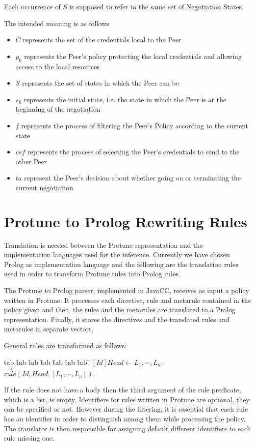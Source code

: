 \documentclass{article}
\newenvironment{program}{\begin{tabbing}
   tab \= tab \= tab \= tab \= tab \= tab \= tab \= \kill}{\end{tabbing}}
\newcommand{\rewrite}{\longrightarrow}
\begin{document}
Each occurrence of $S$ is supposed to refer to the same set of Negotiation States.

The intended meaning is as follows
\begin{itemize}
	\item $C$ represents the set of the credentials local to the Peer
	\item $p_{0}$ represents the Peer's policy protecting the local credentials and allowing access to the local resources
	\item $S$ represents the set of states in which the Peer can be
	\item $s_{0}$ represents the initial state, i.e. the state in which the Peer is at the beginning of the negotiation
	\item $f$ represents the process of filtering the Peer's Policy according to the current state
	\item $csf$ represents the process of selecting the Peer's credentials to send to the other Peer
	\item $ta$ represent the Peer's decision about whether going on or terminating the current negotiation
\end{itemize}

\section{Protune to Prolog Rewriting Rules}

Translation is needed between the Protune representation and the implementation languages used for the inference. Currently we have chosen Prolog as implementation language and the following are the translation rules used in order to transform Protune rules into Prolog rules.

The Protune to Prolog parser, implemented in JavaCC, receives as input a policy written in Protune. It processes each directive, rule and metarule contained in the policy given and then, the rules and the metarules are translated to a Prolog representation. Finally, it stores the directives and the translated rules and metarules in separate vectors.

General rules are transformed as follows:
\begin{program}
$[Id]Head \leftarrow L_1,\cdots,L_n.$\\
\> $\rewrite$ \\
\> \> $rule(Id,Head,[L_1, \cdots, L_n]).$
\end{program}

If the rule does not have a body then the third argument of the rule predicate, which is a list, is empty. Identifiers for rules written in Protune are optional, they can be specified or not. However during the filtering, it is essential that each rule has an identifier in order to distinguish among them while processing the policy. The translator is then responsible for assigning default different identifiers to each rule missing one.
\end{document}
